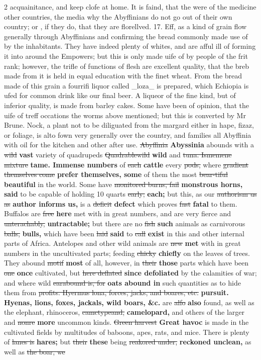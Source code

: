 \documentclass[10pt]{article}
\begin{document}
\begin{multicols}{2}
acquainitance, and keep clofe at home. It is faind, that the were of the medicine other countries, the media why the Abyffinians do not go out of their own country; or , if they do, that they are florellved. 17. Eff, as a kind of grain flow generally through Abyffinians and confirming the bread commonly made use of by the inhabitants. They have indeed plenty of whites, and are afful ill of forming it into around the Empowers; but this is only made uife of by people of the frit rank; however, the trifle of functions of flesh are excellent quality, that the breb made from it is held in equal education with the finet wheat. From the bread made of this grain a fourrifi liquor called \_loza\_ is prepared, which Echiopia is ufed for common drink like our final beer. A liqueor of the fine kind, but of inferior quality, is made from barley cakes. Some have been of opinion, that the uife of treff occations the worms above mentioned; but this is converted by Mr Brune. Nock, a plant not to be diliguated from the margard either in hape, fizaz, or foliage, is alto fown very generally over the country, and families all Abyffinia with oil for the kitchen and other after use. \sout{Abyffinia} \textbf{Abyssinia} abounds with a \sout{wild} \textbf{vast} variety of quadrupeds \sout{Quadrablewild} \textbf{wild} and \sout{tuna. Ismemene mixture} \textbf{tame. Immense numbers} of \sout{each} \textbf{cattle} every \sout{pods,} where \sout{gradient themselves come} \textbf{prefer themselves, some} of them the most \sout{bear-tiful} \textbf{beautiful} in the world. Some have \sout{monitored burns, fail} \textbf{monstrous horns, said} to be capable of holding 10 quarts \sout{early;} \textbf{each;} but this, as our \sout{authorism us as} \textbf{author informs us,} is a \sout{deficit} \textbf{defect} which proves \sout{fast} \textbf{fatal} to them. Buffalos are \sout{free} \textbf{here} met with in great numbers, and are very fierce and \sout{unterachably,} \textbf{untractable;} but there are no \sout{fish} \textbf{such} animals as carnivorous \sout{balls,} \textbf{bulls,} which have been \sout{laid} \textbf{said} to \sout{call} \textbf{exist} in this and other internal parts of Africa. Antelopes and other wild animals are \sout{new} \textbf{met} with in great numbers in the uncultivated parts; feeding \sout{chicky} \textbf{chiefly} on the leaves of trees. They abound \sout{motif} \textbf{most} of all, however, in \sout{their} \textbf{those} parts which have been \sout{one} \textbf{once} cultivated, but \sout{here deflated} \textbf{since defoliated} by the calamities of war; and where wild \sout{earabound is, for} \textbf{oats abound in} such quantities as to hide them from \sout{profits. Hyermus lona, forces, jacks, and boares, etc.} \textbf{pursuit. Hyenas, lions, foxes, jackals, wild boars, \&c.} are \sout{alfo} \textbf{also} found, as well as the elephant, rhinoceros, \sout{camctypeand,} \textbf{camelopard,} and others of the larger and \sout{nonre} \textbf{more} uncommon kinds. \sout{Green harvest} \textbf{Great havoc} is made in the cultivated fields by multitudes of baboons, apes, rats, and mice. There is plenty of \sout{lanes is} \textbf{hares;} but \sout{their} \textbf{these} being \sout{reakored under,} \textbf{reckoned unclean,} as well as \sout{the boar, we} 
\end{multicols}
\end{document}
